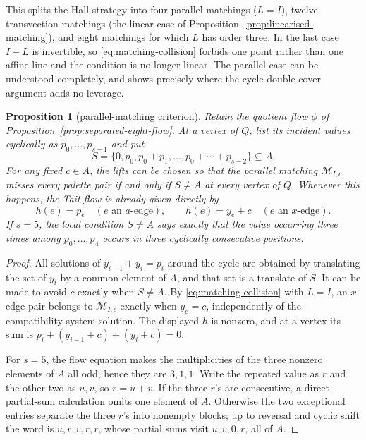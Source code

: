 \documentclass[11pt,a4paper]{article}
\newtheorem{proposition}[theorem]{Proposition}
\theoremstyle{definition}
\theoremstyle{remark}
\begin{document}
This splits the Hall strategy into four parallel matchings ($L=I$), twelve transvection matchings (the linear case of Proposition~\ref{prop:linearised-matching}), and eight matchings for which $L$ has order three.  In the last case $I+L$ is invertible, so \eqref{eq:matching-collision} forbids one point rather than one affine line and the condition is no longer linear.  The parallel case can be understood completely, and shows precisely where the cycle-double-cover argument adds no leverage.

\begin{proposition}[parallel-matching criterion]\label{prop:parallel-matching}
Retain the quotient flow $\phi$ of Proposition~\ref{prop:separated-eight-flow}.  At a vertex of $Q$, list its incident values cyclically as $p_0,\ldots,p_{s-1}$ and put
\[
 S=\{0,p_0,p_0+p_1,\ldots,p_0+\cdots+p_{s-2}\}\subseteq A.
\]
For any fixed $c\in A$, the lifts can be chosen so that the parallel matching $\mathcal M_{I,c}$ misses every palette pair if and only if $S\ne A$ at every vertex of $Q$.  Whenever this happens, the Tait flow is already given directly by
\[
 h(e)=p_e\quad(e\text{ an }a\text{-edge}),\qquad
 h(e)=y_e+c\quad(e\text{ an }x\text{-edge}).
\]
If $s=5$, the local condition $S\ne A$ says exactly that the value occurring three times among $p_0,\ldots,p_4$ occurs in three cyclically consecutive positions.
\end{proposition}
\begin{proof}
All solutions of $y_{i-1}+y_i=p_i$ around the cycle are obtained by translating the set of $y_i$ by a common element of $A$, and that set is a translate of $S$.  It can be made to avoid $c$ exactly when $S\ne A$.  By \eqref{eq:matching-collision} with $L=I$, an $x$-edge pair belongs to $\mathcal M_{I,c}$ exactly when $y_e=c$, independently of the compatibility-system solution.  The displayed $h$ is nonzero, and at a vertex its sum is $p_i+(y_{i-1}+c)+(y_i+c)=0$.

For $s=5$, the flow equation makes the multiplicities of the three nonzero elements of $A$ all odd, hence they are $3,1,1$.  Write the repeated value as $r$ and the other two as $u,v$, so $r=u+v$.  If the three $r$'s are consecutive, a direct partial-sum calculation omits one element of $A$.  Otherwise the two exceptional entries separate the three $r$'s into nonempty blocks; up to reversal and cyclic shift the word is $u,r,v,r,r$, whose partial sums visit $u,v,0,r$, all of $A$.
\end{proof}
\end{document}
